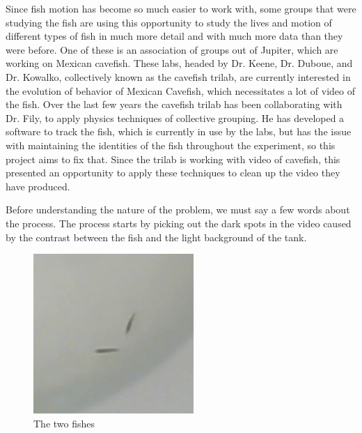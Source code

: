 \documentclass{article}
\begin{document}
Since fish motion has become so much easier to work with, some groups that were studying the fish are using this opportunity to study the lives and motion of different types of fish in much more detail and with much more data than they were before. One of these is an association of groups out of Jupiter, which are working on Mexican cavefish. These labs, headed by Dr. Keene, Dr. Duboue, and Dr. Kowalko, collectively known as the cavefish trilab, are currently interested in the evolution of behavior of Mexican Cavefish, which necessitates a lot of video of the fish. Over the last few years the cavefish trilab has been collaborating with Dr. Fily, to apply physics techniques of collective grouping. He has developed a software to track the fish, which is currently in use by the labs, but has the issue with maintaining the identities of the fish throughout the experiment, so this project aims to fix that. Since the trilab is working with video of cavefish, this presented an opportunity to apply these techniques to clean up the video they have produced. 

Before understanding the nature of the problem, we must say a few words about the process. The process starts by picking out the dark spots in the video caused by the contrast between the fish and the light background of the tank.

\begin{figure}[H]
	\centering
	\includegraphics[width=.5\linewidth]{140cropped}
	\caption{The two fishes}
	\label{fig:fish}
\end{figure}

\end{document}
